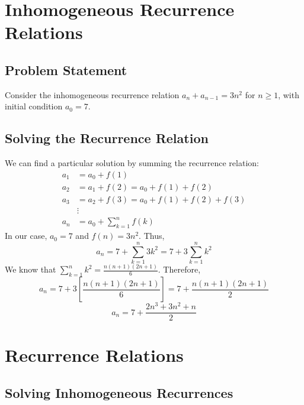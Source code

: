 \documentclass{report}
\begin{document}
\section{Inhomogeneous Recurrence Relations}

\subsection{Problem Statement}

Consider the inhomogeneous recurrence relation $a_n + a_{n-1} = 3n^2$ for $n \geq 1$, with initial condition $a_0 = 7$.

\subsection{Solving the Recurrence Relation}

We can find a particular solution by summing the recurrence relation:
\begin{align*}
	a_1 & = a_0 + f(1)                            \\
	a_2 & = a_1 + f(2) = a_0 + f(1) + f(2)        \\
	a_3 & = a_2 + f(3) = a_0 + f(1) + f(2) + f(3) \\
	    & \vdots                                  \\
	a_n & = a_0 + \sum_{k=1}^{n} f(k)
\end{align*}
In our case, $a_0 = 7$ and $f(n) = 3n^2$. Thus,
$$a_n = 7 + \sum_{k=1}^{n} 3k^2 = 7 + 3\sum_{k=1}^{n} k^2$$
We know that $\sum_{k=1}^{n} k^2 = \frac{n(n+1)(2n+1)}{6}$. Therefore,
$$a_n = 7 + 3\left[\frac{n(n+1)(2n+1)}{6}\right] = 7 + \frac{n(n+1)(2n+1)}{2}$$
$$a_n = 7 + \frac{2n^3 + 3n^2 + n}{2}$$


\section*{Recurrence Relations}

\subsection*{Solving Inhomogeneous Recurrences}

\end{document}
